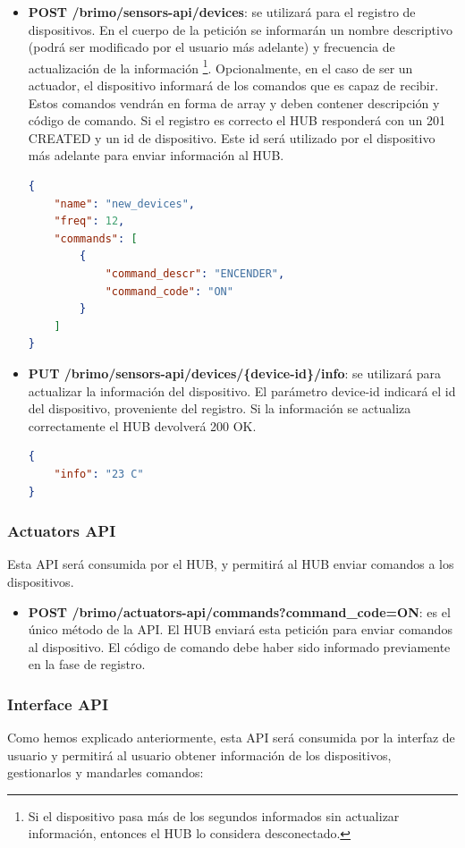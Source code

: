 \begin{itemize}
\item \textbf{POST /brimo/sensors-api/devices}: se utilizará para el registro de dispositivos. En el cuerpo de la petición se informarán
 un nombre descriptivo (podrá ser modificado por el usuario más adelante) y frecuencia
de actualización de la información \footnote{ Si el dispositivo pasa más de los segundos informados sin actualizar información, entonces
el HUB lo considera desconectado.}. Opcionalmente, en el caso de ser un actuador, el dispositivo informará de los comandos que es capaz
de recibir. Estos comandos vendrán en forma de array y deben contener descripción y código de comando.
Si el registro es correcto el HUB responderá con un 201 CREATED y un id de dispositivo. Este id será utilizado por el dispositivo más adelante
para enviar información al HUB.
\begin{lstlisting}[language=json,firstnumber=1]
{
	"name": "new_devices",
	"freq": 12,
	"commands": [
		{
			"command_descr": "ENCENDER",
			"command_code": "ON"
		}
	]
}
\end{lstlisting}
\item \textbf{PUT /brimo/sensors-api/devices/\{device-id\}/info}: se utilizará para actualizar la información del dispositivo. El parámetro
device-id indicará el id del dispositivo, proveniente del registro. Si la información se actualiza correctamente el HUB devolverá 200 OK.
\begin{lstlisting}[language=json,firstnumber=1]
{
	"info": "23 C"
}
\end{lstlisting}
\end{itemize}

\subsubsection{Actuators API}
Esta API será consumida por el HUB, y permitirá al HUB enviar comandos a los dispositivos.

\begin{itemize}

\item \textbf{POST /brimo/actuators-api/commands?command\_code=ON}: es el único método de la API. El HUB enviará esta petición para enviar
comandos al dispositivo. El código de comando debe haber sido informado previamente en la fase de registro.

\end{itemize}

\subsubsection{Interface API}
Como hemos explicado anteriormente, esta API será consumida por la interfaz de usuario y permitirá al usuario obtener información de los dispositivos,
gestionarlos y mandarles comandos:

